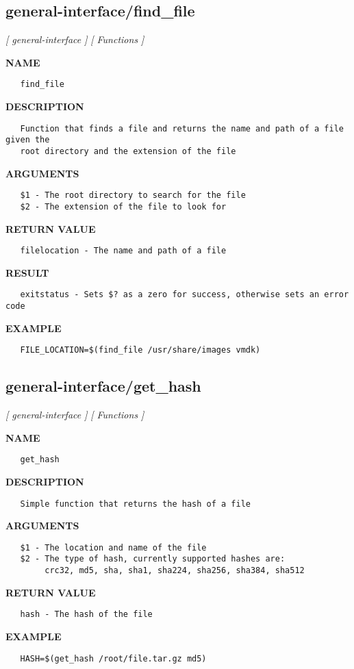 \subsection{general-interface/find\_file}
\textsl{[ general-interface ]}
\textsl{[ Functions ]}

\label{ch:robo24}
\label{ch:general_interface_find_file}
\textbf{NAME}
\begin{verbatim}
   find_file
\end{verbatim}
\textbf{DESCRIPTION}
\begin{verbatim}
   Function that finds a file and returns the name and path of a file given the 
   root directory and the extension of the file
\end{verbatim}
\textbf{ARGUMENTS}
\begin{verbatim}
   $1 - The root directory to search for the file
   $2 - The extension of the file to look for
\end{verbatim}
\textbf{RETURN VALUE}
\begin{verbatim}
   filelocation - The name and path of a file
\end{verbatim}
\textbf{RESULT}
\begin{verbatim}
   exitstatus - Sets $? as a zero for success, otherwise sets an error code
\end{verbatim}
\textbf{EXAMPLE}
\begin{verbatim}
   FILE_LOCATION=$(find_file /usr/share/images vmdk)
\end{verbatim}
\newpage
\subsection{general-interface/get\_hash}
\textsl{[ general-interface ]}
\textsl{[ Functions ]}

\label{ch:robo25}
\label{ch:general_interface_get_hash}
\textbf{NAME}
\begin{verbatim}
   get_hash
\end{verbatim}
\textbf{DESCRIPTION}
\begin{verbatim}
   Simple function that returns the hash of a file
\end{verbatim}
\textbf{ARGUMENTS}
\begin{verbatim}
   $1 - The location and name of the file
   $2 - The type of hash, currently supported hashes are: 
        crc32, md5, sha, sha1, sha224, sha256, sha384, sha512
\end{verbatim}
\textbf{RETURN VALUE}
\begin{verbatim}
   hash - The hash of the file
\end{verbatim}
\textbf{EXAMPLE}
\begin{verbatim}
   HASH=$(get_hash /root/file.tar.gz md5)
\end{verbatim}
\newpage
